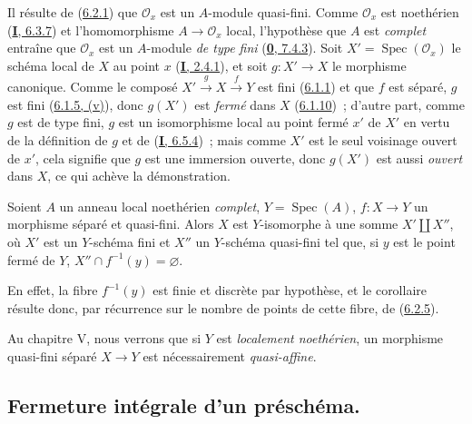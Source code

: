 Il résulte de (\hyperref[II.6.2.1-fr]{6.2.1}) que $\mathcal{O}_x$ est un
$A$-module quasi-fini. Comme $\mathcal{O}_x$ est noethérien
(\hyperref[I.6.3.7-fr]{\textbf{I}, 6.3.7}) et l'homomorphisme
$A\to\mathcal{O}_x$ local, l'hypothèse que $A$ est \emph{complet} entraîne que
$\mathcal{O}_x$ est un $A$-module \emph{de type fini}
(\hyperref[0.7.4.3-fr]{\textbf{0}, 7.4.3}). Soit
$X'=\operatorname{Spec}(\mathcal{O}_x)$ le schéma local de $X$ au point $x$
(\hyperref[I.2.4.1-fr]{\textbf{I}, 2.4.1}), et soit $g:X'\to X$ le morphisme
canonique. Comme le composé $X'\xrightarrow{g}X\xrightarrow{f}Y$ est fini
(\hyperref[II.6.1.1-fr]{6.1.1}) et que $f$ est séparé, $g$ est fini
(\hyperref[II.6.1.5-fr]{6.1.5, (v)}), donc $g(X')$ est \emph{fermé} dans $X$
(\hyperref[II.6.1.10-fr]{6.1.10})~; d'autre part, comme $g$ est de type fini,
$g$ est un isomorphisme local au point fermé $x'$ de $X'$ en vertu de la
définition de $g$ et de (\hyperref[I.6.5.4-fr]{\textbf{I}, 6.5.4})~; mais comme $X'$
est le seul voisinage ouvert de $x'$, cela signifie que $g$ est une immersion
ouverte, donc $g(X')$ est aussi \emph{ouvert} dans $X$, ce qui achève la
démonstration.

\begin{corollary}[6.2.6]
\label{II.6.2.6-fr}
Soient $A$ un anneau local noethérien \emph{complet}, $Y=\operatorname{Spec}(A)$,
$f:X\to Y$ un morphisme séparé et quasi-fini. Alors $X$ est $Y$-isomorphe à
une somme $X'\amalg X''$, où $X'$ est un $Y$-schéma fini et $X''$ un
$Y$-schéma quasi-fini tel que, si $y$ est le point fermé de $Y$,
$X''\cap f^{-1}(y)=\varnothing$.
\end{corollary}

En effet, la fibre $f^{-1}(y)$ est finie et discrète par hypothèse, et le
corollaire résulte donc, par récurrence sur le nombre de points de cette
fibre, de (\hyperref[II.6.2.5-fr]{6.2.5}).

\begin{remark}[6.2.7]
\label{II.6.2.7-fr}
Au chapitre V, nous verrons que si $Y$ est \emph{localement noethérien}, un morphisme
quasi-fini séparé $X\to Y$ est nécessairement \emph{quasi-affine}.
\end{remark}

\subsection{Fermeture intégrale d'un préschéma.}
\label{subsection:II.6.3-fr}

